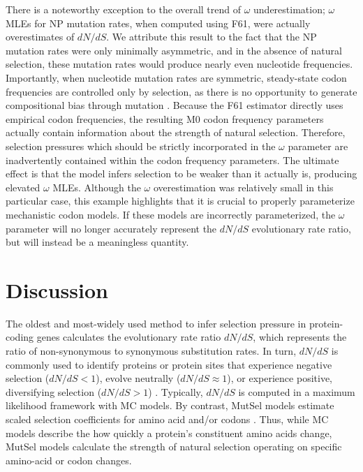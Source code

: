 \documentclass{pnastwo}
\begin{document}
\begin{article}
There is a noteworthy exception to the overall trend of $\omega$ underestimation; $\omega$ MLEs for NP mutation rates, when computed using F61, were actually overestimates of $dN/dS$. We attribute this result to the fact that the NP mutation rates were only minimally asymmetric, and in the absence of natural selection, these mutation rates would produce nearly even nucleotide frequencies. Importantly, when nucleotide mutation rates are symmetric, steady-state codon frequencies are controlled only by selection, as there is no opportunity to generate compositional bias through mutation \cite{SellaHirsh2005}. Because the F61 estimator directly uses empirical codon frequencies, the resulting M0 codon frequency parameters actually contain information about the strength of natural selection. Therefore, selection pressures which should be strictly incorporated in the $\omega$ parameter are inadvertently contained within the codon frequency parameters. The ultimate effect is that the model infers selection to be weaker than it actually is, producing elevated $\omega$ MLEs. Although the $\omega$ overestimation was relatively small in this particular case, this example highlights that it is crucial to properly parameterize mechanistic codon models. If these models are incorrectly parameterized, the $\omega$ parameter will no longer accurately represent the $dN/dS$ evolutionary rate ratio, but will instead be a meaningless quantity.



\section*{Discussion}

The oldest and most-widely used method to infer selection pressure in protein-coding genes calculates the evolutionary rate ratio $dN/dS$, which represents the ratio of non-synonymous to synonymous substitution rates. In turn, $dN/dS$ is commonly used to identify proteins or protein sites that experience negative selection ($dN/dS<1$), evolve neutrally ($dN/dS\approx1$), or experience positive, diversifying selection ($dN/dS>1$) \cite{NielsenYang1998, Yangetal2000, KosakovskyPondFrost2005b}. Typically, $dN/dS$ is computed in a maximum likelihood framework with MC models. By contrast, MutSel models estimate scaled selection coefficients for amino acid and/or codons \cite{HalpernBruno1998,Rodrigueetal2010,Tamurietal2012,Thorne2012,Tamurietal2014}. Thus, while MC models describe the how quickly a protein's constituent amino acids change, MutSel models calculate the strength of natural selection operating on specific amino-acid or codon changes.  


\end{article}
\end{document}
